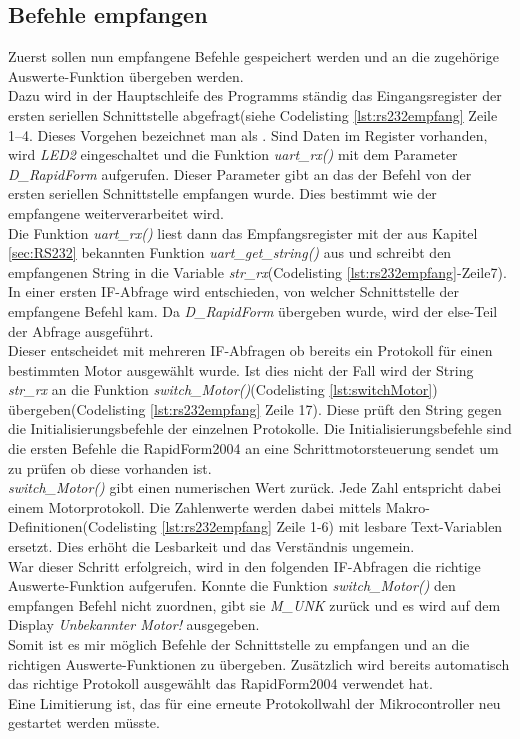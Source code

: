 \subsection{Befehle empfangen}
Zuerst sollen nun empfangene Befehle gespeichert werden und an die zugehörige Auswerte-Funktion übergeben werden.\\
Dazu wird in der Hauptschleife des Programms ständig das Eingangsregister der ersten seriellen Schnittstelle abgefragt(siehe Codelisting \ref{lst:rs232empfang} Zeile 1--4. Dieses Vorgehen bezeichnet man als .
Sind Daten im Register vorhanden, wird \emph{LED2} eingeschaltet und die Funktion \emph{uart\_rx()} mit dem Parameter \emph{D\_RapidForm} aufgerufen. Dieser Parameter gibt an das der Befehl von der ersten seriellen Schnittstelle empfangen wurde. Dies bestimmt wie der empfangene  weiterverarbeitet wird. \\
Die Funktion \emph{uart\_rx()} liest dann das Empfangsregister mit der aus Kapitel \ref{sec:RS232} bekannten Funktion \emph{uart\_get\_string()} aus und schreibt den empfangenen String in die Variable \emph{str\_rx}(Codelisting \ref{lst:rs232empfang}-Zeile7).\\
In einer ersten IF-Abfrage wird entschieden, von welcher Schnittstelle der empfangene Befehl kam. Da \emph{D\_RapidForm} übergeben wurde, wird der else-Teil der Abfrage ausgeführt.\\
Dieser entscheidet mit mehreren IF-Abfragen ob bereits ein Protokoll für einen bestimmten Motor ausgewählt wurde.
Ist dies nicht der Fall wird der String \emph{str\_rx} an die Funktion \emph{switch\_Motor()}(Codelisting \ref{lst:switchMotor}) übergeben(Codelisting \ref{lst:rs232empfang} Zeile 17). Diese prüft den String gegen die Initialisierungsbefehle der einzelnen Protokolle. Die Initialisierungsbefehle sind die ersten Befehle die RapidForm2004 an eine Schrittmotorsteuerung sendet um zu prüfen ob diese vorhanden ist.\\
\emph{switch\_Motor()} gibt einen numerischen Wert zurück. Jede Zahl entspricht dabei einem Motorprotokoll. Die Zahlenwerte werden dabei mittels Makro-Definitionen(Codelisting \ref{lst:rs232empfang} Zeile 1-6) mit lesbare Text-Variablen ersetzt. Dies erhöht die Lesbarkeit und das Verständnis ungemein.\\
War dieser Schritt erfolgreich, wird in den folgenden IF-Abfragen die richtige Auswerte-Funktion aufgerufen. Konnte die Funktion \emph{switch\_Motor()} den empfangen Befehl nicht zuordnen, gibt sie \emph{M\_UNK} zurück und es wird auf dem Display \emph{Unbekannter Motor!} ausgegeben.\\
Somit ist es mir möglich Befehle der Schnittstelle zu empfangen und an die richtigen Auswerte-Funktionen zu übergeben. Zusätzlich wird bereits automatisch das richtige Protokoll ausgewählt das RapidForm2004 verwendet hat.\\
Eine Limitierung ist, das für eine erneute Protokollwahl der Mikrocontroller neu gestartet werden müsste.

